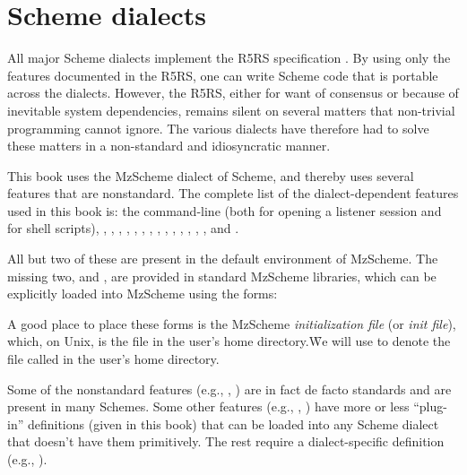 \chapter{Scheme dialects}
\label{dialect}

All major Scheme dialects implement the R5RS
specification \cite{r5rs}.  By using only the features
documented in the R5RS, one can write Scheme code that
is portable across the dialects.  However, the R5RS,
either for want of consensus or because of inevitable
system dependencies, remains silent on several matters
that non-trivial programming cannot ignore.  The
various dialects have therefore had to solve these
matters in a non-standard and idiosyncratic manner.


This book uses the MzScheme \cite{mzscheme}
dialect of Scheme, and thereby uses several
features that are nonstandard.  The complete
list of the dialect-dependent features used
in this book is: the command-line (both for
opening a listener session and for shell scripts),
, , ,
, ,
, , ,
, ,
, , ,
,   and .

All but two of these
are present in the default environment of MzScheme.  The missing two,
 and , are provided in
standard MzScheme libraries, which can be explicitly loaded into
MzScheme using the forms:


\n A good place to place these forms is the MzScheme
{\em initialization file} (or {\em init file}), which, on Unix, is the file
 in the user’s home directory.\f{We will
use  to denote the file called
 in the user’s home directory.}

Some of the nonstandard features (e.g., ,
) are in fact de facto standards and are present
in many Schemes.  Some other features (e.g., ,
) have more or less “plug-in” definitions
(given in this book) that can be loaded into any Scheme
dialect that doesn’t have them primitively.  The rest
require a dialect-specific definition
(e.g., ).

